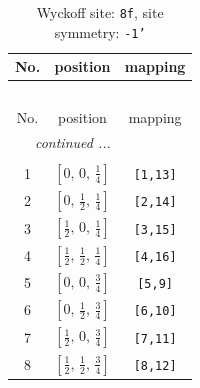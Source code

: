 \documentclass[fleqn,8pt]{jsarticle}
\begin{document}
\begin{longtable}{ccc}
\caption{Wyckoff site: {\tt 8f}, site symmetry: {\tt -1'}}
 \\
 \hline \hline
No. & position & mapping \\ \hline \endfirsthead

\multicolumn{2}{l}{\tablename\ \thetable{}} \\
 \hline \hline
No. & position & mapping \\ \hline \endhead

 \hline \hline
\multicolumn{2}{r}{\footnotesize\it continued ...} \\ \endfoot

 \hline \hline
\multicolumn{2}{r}{} \\ \endlastfoot

1 & $\left[ 0,\, 0,\, \frac{1}{4} \right]$ & {\tt [1,13]} \\ \hline
2 & $\left[ 0,\, \frac{1}{2},\, \frac{1}{4} \right]$ & {\tt [2,14]} \\ \hline
3 & $\left[ \frac{1}{2},\, 0,\, \frac{1}{4} \right]$ & {\tt [3,15]} \\ \hline
4 & $\left[ \frac{1}{2},\, \frac{1}{2},\, \frac{1}{4} \right]$ & {\tt [4,16]} \\ \hline
5 & $\left[ 0,\, 0,\, \frac{3}{4} \right]$ & {\tt [5,9]} \\ \hline
6 & $\left[ 0,\, \frac{1}{2},\, \frac{3}{4} \right]$ & {\tt [6,10]} \\ \hline
7 & $\left[ \frac{1}{2},\, 0,\, \frac{3}{4} \right]$ & {\tt [7,11]} \\ \hline
8 & $\left[ \frac{1}{2},\, \frac{1}{2},\, \frac{3}{4} \right]$ & {\tt [8,12]} \\
\end{longtable}
\renewcommand{\arraystretch}{1.2}
\end{document}
